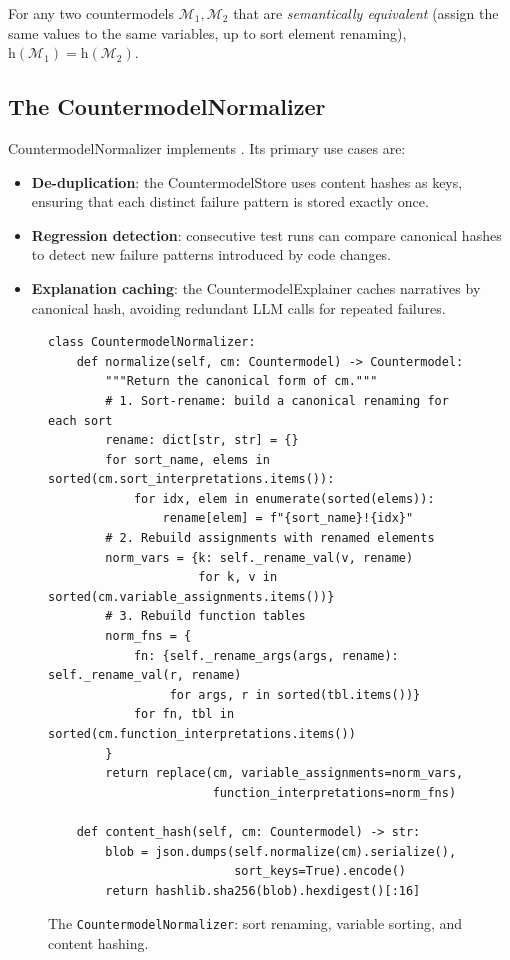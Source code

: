 \documentclass[11pt]{article}
\newcommand{\CMod}{\mathcal{M}}            %
\newcommand{\hash}{\mathrm{h}}             %
\begin{document}
\begin{proposition}[Canonicity]\label{prop:canonical}
For any two countermodels $\CMod_1, \CMod_2$ that are
\emph{semantically equivalent} (assign the same values to the same
variables, up to sort element renaming),
$\hash(\CMod_1) = \hash(\CMod_2)$.
\end{proposition}

\subsection{The CountermodelNormalizer}

\textsf{CountermodelNormalizer} implements .  Its
primary use cases are:
\begin{itemize}[leftmargin=1.5em]
  \item \textbf{De-duplication}: the \textsf{CountermodelStore} uses
        content hashes as keys, ensuring that each distinct failure
        pattern is stored exactly once.
  \item \textbf{Regression detection}: consecutive test runs can compare
        canonical hashes to detect new failure patterns introduced by
        code changes.
  \item \textbf{Explanation caching}: the \textsf{CountermodelExplainer}
        caches narratives by canonical hash, avoiding redundant LLM calls
        for repeated failures.
\end{itemize}

\begin{figure}[ht]
\begin{lstlisting}[style=jugeo-python]
class CountermodelNormalizer:
    def normalize(self, cm: Countermodel) -> Countermodel:
        """Return the canonical form of cm."""
        # 1. Sort-rename: build a canonical renaming for each sort
        rename: dict[str, str] = {}
        for sort_name, elems in sorted(cm.sort_interpretations.items()):
            for idx, elem in enumerate(sorted(elems)):
                rename[elem] = f"{sort_name}!{idx}"
        # 2. Rebuild assignments with renamed elements
        norm_vars = {k: self._rename_val(v, rename)
                     for k, v in sorted(cm.variable_assignments.items())}
        # 3. Rebuild function tables
        norm_fns = {
            fn: {self._rename_args(args, rename): self._rename_val(r, rename)
                 for args, r in sorted(tbl.items())}
            for fn, tbl in sorted(cm.function_interpretations.items())
        }
        return replace(cm, variable_assignments=norm_vars,
                       function_interpretations=norm_fns)

    def content_hash(self, cm: Countermodel) -> str:
        blob = json.dumps(self.normalize(cm).serialize(),
                          sort_keys=True).encode()
        return hashlib.sha256(blob).hexdigest()[:16]
\end{lstlisting}
\caption{The \texttt{CountermodelNormalizer}: sort renaming, variable
         sorting, and content hashing.}
\label{fig:normalizer}
\end{figure}
\end{document}
